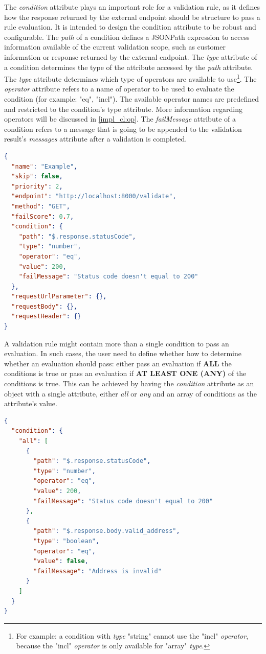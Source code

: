     The \emph{condition} attribute plays an important role for a validation rule, as it defines how the response returned by the external endpoint should be structure to pass a rule evaluation. It is intended to design the condition attribute to be robust and configurable. The \emph{path} of a condition defines a JSONPath\autocite{Friesen2019} expression to access information available of the current validation scope, such as customer information or response returned by the external endpoint. The \emph{type} attribute of a condition determines the type of the attribute accessed by the \emph{path} attribute. The \emph{type} attribute determines which type of operators are available to use\footnote{For example: a condition with \emph{type} "string" cannot use the "incl" \emph{operator}, because the "incl" \emph{operator} is only available for "array" \emph{type}.}. The \emph{operator} attribute refers to a name of operator to be used to evaluate the condition (for example: "eq", "incl"). The available operator names are predefined and restricted to the condition's type attribute. More information regarding operators will be discussed in \autoref{impl_cl:op}. The \emph{failMessage} attribute of a condition refers to a message that is going to be appended to the validation result's \emph{messages} attribute after a validation is completed.

    \begin{lstlisting}[caption={Validation rule example (JSON)}, language=json]
{
  "name": "Example",
  "skip": false,
  "priority": 2,
  "endpoint": "http://localhost:8000/validate",
  "method": "GET",
  "failScore": 0.7,
  "condition": {
    "path": "$.response.statusCode",
    "type": "number",
    "operator": "eq",
    "value": 200,
    "failMessage": "Status code doesn't equal to 200"
  },
  "requestUrlParameter": {},
  "requestBody": {},
  "requestHeader": {}
}
    \end{lstlisting}

    A validation rule might contain more than a single condition to pass an evaluation. In such cases, the user need to define whether how to determine whether an evaluation should pass: either pass an evaluation if \textbf{ALL} the conditions is true or pass an evaluation if \textbf{AT LEAST ONE (ANY)} of the conditions is true. This can be achieved by having the \emph{condition} attribute as an object with a single attribute, either \emph{all} or \emph{any} and an array of conditions as the attribute's value.

    \begin{lstlisting}[caption={Validation rule \textbf{condition} attribute example with ALL condition (JSON)}, language=json]
{
  "condition": {
    "all": [
      {
        "path": "$.response.statusCode",
        "type": "number",
        "operator": "eq",
        "value": 200,
        "failMessage": "Status code doesn't equal to 200"
      },
      {
        "path": "$.response.body.valid_address",
        "type": "boolean",
        "operator": "eq",
        "value": false,
        "failMessage": "Address is invalid"
      }
    ]
  }
}
    \end{lstlisting}

